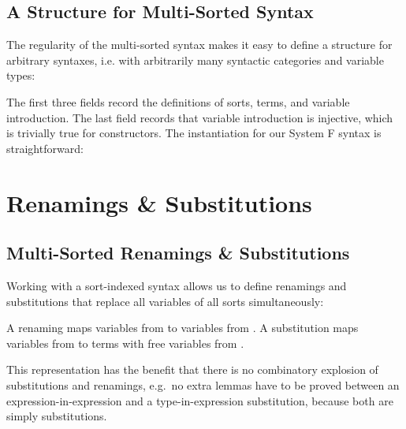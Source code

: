 \documentclass[a4paper, UKenglish, cleveref, autoref, thm-restate]{lipics-v2021}
\newenvironment{LibCode*}{%
  \begin{tcolorbox}[%
    colframe=white,%
    boxrule=0.0pt,%
    top=2.5pt,%
    left=2.5pt,%
    bottom=2.5pt,%
    right=2.5pt,%
    before skip=5pt,%
    after skip=5pt,%
    boxsep=0pt%
  ]
}{%
  \end{tcolorbox}%
}
\newenvironment{ExampleCode*}{%
  \begin{tcolorbox}[%
    colframe=white,%
    colback=yellow!5,%
    boxrule=0.0pt,%
    top=2.5pt,%
    left=2.5pt,%
    bottom=2.5pt,%
    right=2.5pt,%
    before skip=5pt,%
    after skip=5pt,%
    boxsep=0pt%
  ]\vspace{-0.2\baselineskip}%
}{%
  \vspace{-1\baselineskip}%
  \end{tcolorbox}%
}
\newcommand*\LibCode[1]{\begin{LibCode*}{#1}\end{LibCode*}}
\newcommand*\AppCode[1]{{#1}}
\newcommand*\ExampleCode[1]{\begin{ExampleCode*}{#1}\end{ExampleCode*}}
\newcommand*\ACode[1]{\AgdaFontStyle{\textcolor{mygray}{#1}}}
\newcommand*\AField[1]{\AgdaField{#1}}
\newcommand*\ACon[1]{\AgdaInductiveConstructor{#1}}
\newcommand*\ADef[1]{\AgdaFunction{#1}}
\begin{document}

  \subsection{A Structure for Multi-Sorted Syntax}
  \label{sec:syntax:structure}
  The regularity of the multi-sorted syntax makes it easy to define a
  structure for arbitrary syntaxes, i.e. with arbitrarily many syntactic categories and variable types:
  \LibCode\KSyntax
  \noindent The first three fields record the definitions of sorts, terms, and variable introduction.
  The last field records that variable introduction
  \ACode{\AField{`\_}} is injective, which is trivially true for
  constructors. The instantiation for our System F syntax is
  straightforward:
  \AppCode\FSyntaxInst

  \section{Renamings \& Substitutions}
  \label{sec:maps}
  \subsection{Multi-Sorted Renamings \& Substitutions}
  \label{sec:maps:example}
  Working with a sort-indexed syntax allows us to define renamings and substitutions
  that replace all variables of all sorts simultaneously:

  \ExampleCode\FExampleSubRen

  \noindent A renaming \ACode{S₁ \ADef{→ᵣ} S₂} maps variables from \ACode{S₁} to
  variables from \ACode{S₂}.
  A substitution \ACode{S₁ \ADef{→ₛ} S₂} maps variables from \ACode{S₁} to
  terms with free variables from \ACode{S₂}.


  This representation has the benefit that there is no combinatory
  explosion of substitutions and renamings, e.g.\ no extra lemmas have to be
  proved between an expression-in-expression and a type-in-expression
  substitution, because both are simply substitutions.
\end{document}
